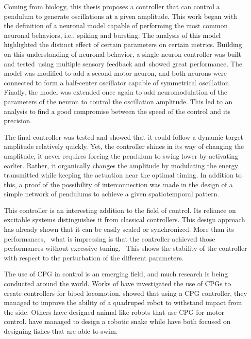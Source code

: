 Coming from biology, this thesis proposes a controller that can control a pendulum to generate oscillations at a given amplitude.
This work began with the definition of a neuronal model capable of performing the most common neuronal behaviors, i.e., spiking and bursting.
The analysis of this model highlighted the distinct effect of certain parameters on certain metrics.
Building on this understanding of neuronal behavior, a single-neuron controller was built and tested using multiple sensory feedback and showed great performance.
The model was modified to add a second motor neuron, and both neurons were connected to form a half-center oscillator capable of symmetrical oscillation.
Finally, the model was extended once again to add neuromodulation of the parameters of the neuron to control the oscillation amplitude.
This led to an analysis to find a good compromise between the speed of the control and its precision. 

The final controller was tested and showed that it could follow a dynamic target amplitude relatively quickly.
Yet, the controller shines in its way of changing the amplitude, it never requires forcing the pendulum to swing lower by activating earlier.
Rather, it organically changes the amplitude by modulating the energy transmitted while keeping the actuation near the optimal timing.
In addition to this, a proof of the possibility of interconnection was made in the design of a simple network of pendulums to achieve a given spatiotemporal pattern.

This controller is an interesting addition to the field of control.
Its reliance on excitable systems distinguishes it from classical controllers.
This design approach has already shown that it can be easily scaled or synchronized.
More than its performances,  what is impressing is that the controller achieved those performances without excessive tuning. 
This shows the stability of the controller with respect to the perturbation of the different parameters.

The use of CPG in control is an emerging field, and much research is being conducted around the world.
Works of \citet{related2,related3,related4,related5} have investigated the use of CPGs to create controllers for biped locomotion. \citet{related1} showed that using a CPG controller, they managed to improve the ability of a quadruped robot to withstand impact from the side. Others have designed animal-like robots that use CPG for motor control. \citet{related6} have managed to design a robotic snake while \citet{related7,related8} have both focused on designing fishes that are able to swim.

